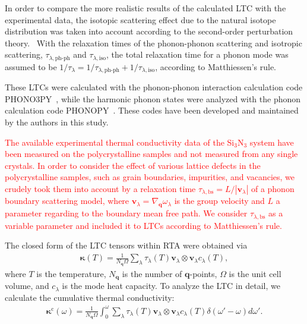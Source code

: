 \documentclass[twocolumn,amsmath,amssymb,a4paper,prb,superscriptaddress,floatfix]{revtex4-1}
\begin{document}
In order to compare the more realistic results of the calculated LTC
with the experimental data, the isotopic scattering effect due to the
natural isotope distribution was taken into account according to the
second-order perturbation theory.~\cite{tamura} With the relaxation times of the
phonon-phonon scattering and isotropic scattering,
$\tau_{\lambda,\text{ph-ph}}$ and $\tau_{\lambda,\text{iso}}$, the total
relaxation time for a phonon mode was assumed to be
$1/\tau_{\lambda} = 1/\tau_{\lambda,\text{ph-ph}} +
1/\tau_{\lambda,\text{iso}}$, according to Matthiessen's rule.

These LTCs were calculated with the phonon-phonon interaction
calculation code PHONO3PY~\cite{phono3py}, while the harmonic phonon states were
analyzed with the phonon calculation code
PHONOPY~\cite{phonopy}. These codes have been
developed and maintained by the authors in this study.

\textcolor{red}{The available experimental thermal conductivity data of
the Si$_3$N$_3$ system have been measured on the polycrystalline samples
and not measured from any single crystals. In order to consider the
effect of various lattice defects in the polycrystalline samples, such
as grain boundaries, impurities, and vacancies, we crudely took them
into account by a relaxation time
$\tau_{\lambda,\text{bs}}=L/|\mathbf{v}_\lambda|$ of a phonon boundary
scattering model, where $\mathbf{v}_\lambda =
\nabla_{\mathbf{q}}\omega_\lambda$ is the group velocity and $L$ a
parameter regarding to the boundary mean free path. We consider
$\tau_{\lambda,\text{bs}}$ as a variable parameter and included it to
LTCs according to Matthiessen's rule.}

The closed form of the LTC tensors within RTA were obtained via 
\begin{align}
 \label{eq:kappa}
 \boldsymbol{\kappa}(T) = \frac{1}{N_\mathbf{q}\Omega} \sum_\lambda
 \tau_\lambda(T) \mathbf{v}_\lambda \otimes \mathbf{v}_\lambda c_\lambda(T),
\end{align}
where $T$ is the temperature, $N_\mathbf{q}$ is the number of
$\mathbf{q}$-points, $\Omega$ is the unit cell volume, and $c_\lambda$
is the mode heat capacity. To analyze the LTC in detail, we calculate
the cumulative thermal conductivity:
\begin{align}
 \label{eq:cum-kappa}
 \boldsymbol{\kappa}^\text{c}(\omega) = \frac{1}{N_\mathbf{q}\Omega}
 \int_0^\omega \sum_\lambda
 \tau_\lambda(T) \mathbf{v}_\lambda \otimes \mathbf{v}_\lambda
 c_\lambda(T) \delta(\omega'-\omega)d\omega'.
\end{align}
\end{document}
